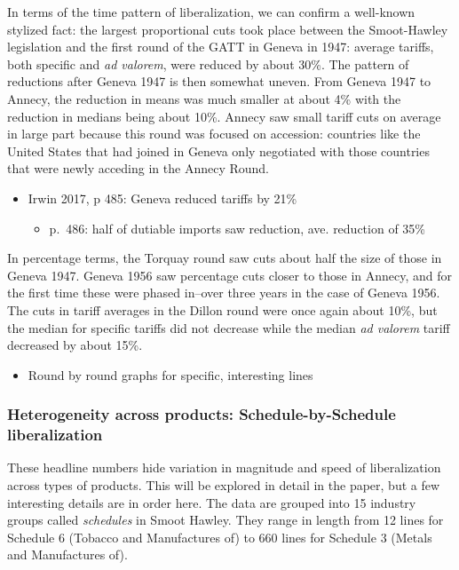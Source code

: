 \documentclass[
  12pt,
]{article}
\providecommand{\tightlist}{%
  \setlength{\itemsep}{0pt}\setlength{\parskip}{0pt}}
\begin{document}
In terms of the time pattern of liberalization, we can confirm a well-known stylized fact: the largest proportional cuts took place between the Smoot-Hawley legislation and the first round of the GATT in Geneva in 1947: average tariffs, both specific and \emph{ad valorem}, were reduced by about 30\%. The pattern of reductions after Geneva 1947 is then somewhat uneven. From Geneva 1947 to Annecy, the reduction in means was much smaller at about 4\% with the reduction in medians being about 10\%. Annecy saw small tariff cuts on average in large part because this round was focused on accession: countries like the United States that had joined in Geneva only negotiated with those countries that were newly acceding in the Annecy Round.

\begin{itemize}
\item
  Irwin 2017, p 485: Geneva reduced tariffs by 21\%

  \begin{itemize}
  \tightlist
  \item
    p.~486: half of dutiable imports saw reduction, ave. reduction of 35\%
  \end{itemize}
\end{itemize}

In percentage terms, the Torquay round saw cuts about half the size of those in Geneva 1947. Geneva 1956 saw percentage cuts closer to those in Annecy, and for the first time these were phased in--over three years in the case of Geneva 1956. The cuts in tariff averages in the Dillon round were once again about 10\%, but the median for specific tariffs did not decrease while the median \emph{ad valorem} tariff decreased by about 15\%.

\begin{itemize}
\tightlist
\item
  Round by round graphs for specific, interesting lines
\end{itemize}

\hypertarget{heterogeneity-across-products-schedule-by-schedule-liberalization}{%
\subsubsection{Heterogeneity across products: Schedule-by-Schedule liberalization}\label{heterogeneity-across-products-schedule-by-schedule-liberalization}}

These headline numbers hide variation in magnitude and speed of liberalization across types of products. This will be explored in detail in the paper, but a few interesting details are in order here. The data are grouped into 15 industry groups called \emph{schedules} in Smoot Hawley. They range in length from 12 lines for Schedule 6 (Tobacco and Manufactures of) to 660 lines for Schedule 3 (Metals and Manufactures of).
\end{document}
